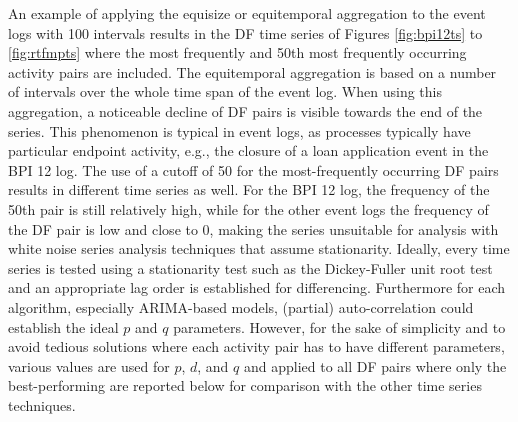 An example of applying the equisize or equitemporal aggregation to the event logs with 100 intervals results in the DF time series of Figures \ref{fig:bpi12ts} to \ref{fig:rtfmpts} where the most frequently and 50th most frequently occurring activity pairs are included.
The equitemporal aggregation is based on a number of intervals over the whole time span of the event log.
When using this aggregation, a noticeable decline of DF pairs is visible towards the end of the series.
This phenomenon is typical in event logs, as processes typically have particular endpoint activity, e.g., the closure of a loan application event in the BPI 12 log.
The use of a cutoff of 50 for the most-frequently occurring DF pairs results in different time series as well.
For the BPI 12 log, the frequency of the 50th pair is still relatively high, while for the other event logs the frequency of the DF pair is low and close to 0, making the series unsuitable for analysis with white noise series analysis techniques that assume stationarity.
Ideally, every time series is tested using a stationarity test such as the Dickey-Fuller unit root test \cite{leybourne1995testing} and an appropriate lag order is established for differencing. 
Furthermore for each algorithm, especially ARIMA-based models, (partial) auto-correlation could establish the ideal $p$ and $q$ parameters.
However, for the sake of simplicity and to avoid tedious solutions where each activity pair has to have different parameters, various values are used for $p$, $d$, and $q$ and applied to all DF pairs where only the best-performing are reported below for comparison with the other time series techniques.

